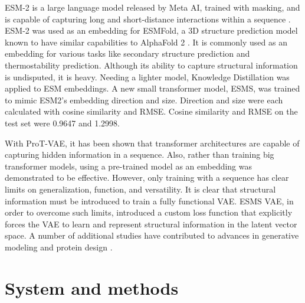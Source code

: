 \documentclass[numsec,webpdf,contemporary,medium]{oup-authoring-template}
\begin{document}
ESM-2 is a large language model released by Meta AI, trained with masking, and is capable of capturing long and short-distance interactions within a sequence \citep{rives2021biological}. ESM-2 was used as an embedding for ESMFold, a 3D structure prediction model known to have similar capabilities to AlphaFold 2 \citep{lin2022esmfold, jumper2021highly}. It is commonly used as an embedding for various tasks like secondary structure prediction and thermostability prediction. Although its ability to capture structural information is undisputed, it is heavy. Needing a lighter model, Knowledge Distillation \citep{hinton2015distillingknowledgeneuralnetwork} was applied to ESM embeddings. A new small transformer model, ESMS, was trained to mimic ESM2's embedding direction and size. Direction and size were each calculated with cosine similarity and RMSE. Cosine similarity and RMSE on the test set were 0.9647 and 1.2998.


With ProT-VAE, it has been shown that transformer architectures are capable of capturing hidden information in a sequence. Also, rather than training big transformer models, using a pre-trained model as an embedding was demonstrated to be effective. However, only training with a sequence has clear limits on generalization, function, and versatility. It is clear that structural information must be introduced to train a fully functional VAE. ESMS VAE, in order to overcome such limits, introduced a custom loss function that explicitly forces the VAE to learn and represent structural information in the latent vector space.
A number of additional studies have contributed to advances in generative modeling and protein design \citep{alley2019unified,anand2022protein,anishchenko2021de,baek2021accurate,devlin2019bert,ferruz2022protein,fowler2014deep,frazer2021disease,greener2022guide,higgins2017beta,hopf2017mutation,ingraham2019generative,kuhlman2000native,madani2020progen,meier2021language,notin2022tranception,rao2019evaluating,rao2021msa,repecka2021expanding,russ2020evolution,sohn2015learning,srivastava2014dropout,strokach2020fast,vaswani2017attention,wu2022high,yang2019machine,zuckerkandl1965molecules}.

\section{System and methods}\label{sec:methods}
\end{document}
